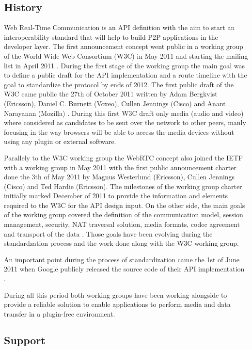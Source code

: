 \subsection{History}

Web Real-Time Communication is an API definition with the aim to start an interoperability standard that will help to build P2P applications in the developer layer. The first announcement concept went public in a working group of the World Wide Web Consortium (W3C) in May 2011 \cite{webrtcW3cgroup} and starting the mailing list in April 2011 \cite{welcomeW3C}. During the first stage of the working group the main goal was to define a public draft for the API implementation and a route timeline with the goal to standardize the protocol by ends of 2012. The first public draft of the W3C came public the 27th of October 2011 written by Adam Bergkvist (Ericsson), Daniel C. Burnett (Voxeo), Cullen Jennings (Cisco) and Anant Narayanan (Mozilla) \cite{originalW3Cdraft}. During this first W3C draft only media (audio and video) where considered as candidates to be sent over the network to other peers, manly focusing in the way browsers will be able to access the media devices without using any plugin or external software.

Parallely to the W3C working group the WebRTC concept also joined the IETF with a working group in May 2011 \cite{webrtcIETFgroup} with the first public announcement charter done the 3th of May 2011 by Magnus Westerlund (Ericsson), Cullen Jennings (Cisco) and Ted Hardie (Ericsson). The milestones of the working group charter initially marked December of 2011 to provide the information and elements required to the W3C for the API design input. On the other side, the main goals of the working group covered the definition of the communication model, session management, security, NAT traversal solution, media formats, codec agreement and transport of the data \cite{webrtcIETFcharter}. Those goals have been evolving during the standardzation process and the work done along with the W3C working group.

An important point during the process of standardization came the 1st of June 2011 when Google publicly released the source code of their API implementation \cite{haraldpublicWebRTC}. 

During all this period both working groups have been working alongside to provide a reliable solution to enable applications to perform media and data transfer in a plugin-free environment.

\subsection{Support}

